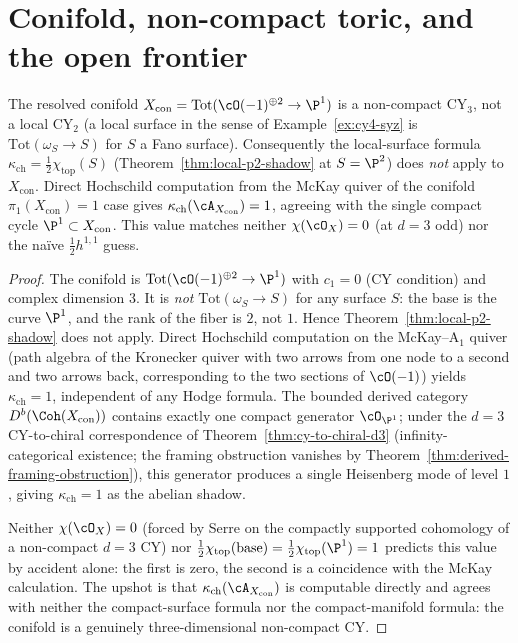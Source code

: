 \section{Conifold, non-compact toric, and the open frontier}
\label{sec:cy-strat-conifold}

\begin{corollary}
\label{cor:conifold-non-local-surface}
The resolved conifold $X_{\mathrm{con}} = \mathrm{Tot}(\cO(-1)^{\oplus 2} \to
\P^1)$ is a non-compact CY$_3$, not a local CY$_2$ (a local surface in
the sense of Example~\ref{ex:cy4-syz} is
$\mathrm{Tot}(\omega_S \to S)$ for $S$ a Fano surface). Consequently the
local-surface formula $\kappa_{\mathrm{ch}} = \frac{1}{2}
\chi_{\mathrm{top}}(S)$ (Theorem~\ref{thm:local-p2-shadow} at $S =
\P^2$) does \emph{not} apply to $X_{\mathrm{con}}$. Direct Hochschild
computation from the McKay quiver of the conifold
$\pi_1(X_{\mathrm{con}}) = 1$ case gives
$\kappa_{\mathrm{ch}}(\cA_{X_{\mathrm{con}}}) = 1$, agreeing with the
single compact cycle $\P^1 \subset X_{\mathrm{con}}$. This value
matches neither $\chi(\cO_X) = 0$ (at $d = 3$ odd) nor the
na\"ive $\frac{1}{2} h^{1,1}$ guess.
\end{corollary}

\begin{proof}
The conifold is $\mathrm{Tot}(\cO(-1)^{\oplus 2} \to \P^1)$ with $c_1 = 0$ (CY
condition) and complex dimension $3$. It is \emph{not} $\mathrm{Tot}(\omega_S
\to S)$ for any surface $S$: the base is the curve $\P^1$, and the
rank of the fiber is $2$, not $1$. Hence Theorem~\ref{thm:local-p2-shadow}
does not apply.
Direct Hochschild computation on the McKay--A$_1$ quiver (path algebra
of the Kronecker quiver with two arrows from one node to a second and
two arrows back, corresponding to the two sections of $\cO(-1)$) yields
$\kappa_{\mathrm{ch}} = 1$, independent of any Hodge formula. The
bounded derived category $D^b(\Coh(X_{\mathrm{con}}))$ contains exactly
one compact generator $\cO_{\P^1}$; under the $d = 3$ CY-to-chiral
correspondence of Theorem~\ref{thm:cy-to-chiral-d3} (infinity-categorical
existence; the framing obstruction vanishes by
Theorem~\ref{thm:derived-framing-obstruction}), this generator
produces a single Heisenberg mode of level $1$, giving $\kappa_{\mathrm{ch}}
= 1$ as the abelian shadow.

Neither $\chi(\cO_X) = 0$ (forced by Serre on the compactly supported
cohomology of a non-compact $d = 3$ CY) nor $\frac{1}{2}
\chi_{\mathrm{top}}(\mathrm{base}) = \frac{1}{2} \chi_{\mathrm{top}}(\P^1)
= 1$ predicts this value by accident alone: the first is zero, the
second is a coincidence with the McKay calculation. The upshot is that
$\kappa_{\mathrm{ch}}(\cA_{X_{\mathrm{con}}})$
is computable directly and agrees with neither the compact-surface
formula nor the compact-manifold formula: the conifold is a genuinely
three-dimensional non-compact CY.
\end{proof}

